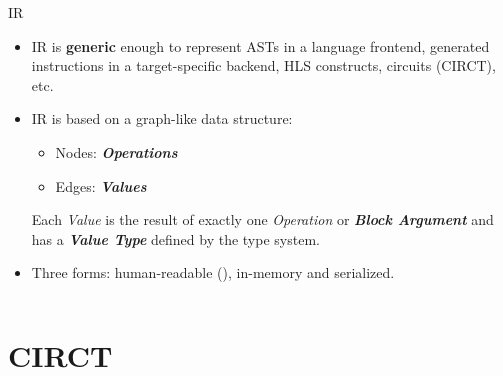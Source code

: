 \documentclass[8pt,a4paper,oneside,hidelinks,aspectratio=169,dvipsnames]{beamer}
\newcommand{\code}[1]{\texttt{\detokenize{#1}}}
\begin{document}
\begin{frame}{ IR}
  \begin{itemize}
    \item IR is \textbf{generic} enough to represent ASTs in a language frontend, generated instructions in a target-specific backend, HLS constructs, circuits (CIRCT), etc.
    \item IR is based on a graph-like data structure:
          \begin{itemize}
            \item Nodes: \textbf{\textit{Operations}}
            \item Edges: \textbf{\textit{Values}}
          \end{itemize}
          Each \textit{Value} is the result of exactly one \textit{Operation} or \textbf{\textit{Block Argument}} and has a \textbf{\textit{Value Type}} defined by the type system.
    \item Three forms: human-readable (\code{.mlir}), in-memory and serialized.
  \end{itemize}
  \begin{figure}[H]
    \centering
    \begin{minipage}{0.475\textwidth}
      \inputminted[tabsize=2,frame=single,rulecolor=gray,fontsize=\fontsize{6}{6}]{text}{fig/mlir_ir_example.mlir}
    \end{minipage}
  \end{figure}
\end{frame}

\section{CIRCT}
\end{document}
